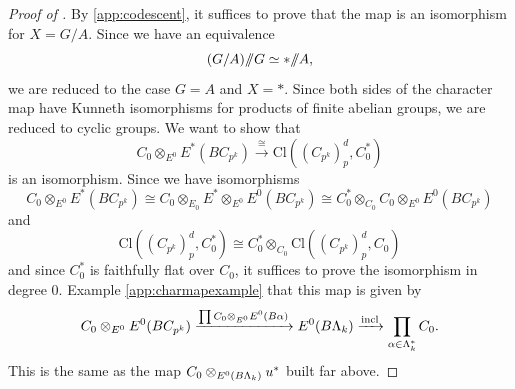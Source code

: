 \begin{proof}[{Proof of }]
By \ref{app:codescent}, it suffices to prove that the map is an isomorphism for \(X = G/A\).
Since we have an equivalence
\[
(G/A) /\!\!/ G \simeq * /\!\!/ A,
\]
we are reduced to the case \(G = A\) and \(X = *\).
Since both sides of the character map have Kunneth isomorphisms for products of finite abelian groups, we are reduced to cyclic groups.
We want to show that 
\[
C_0 \otimes_{E^0} E^*(BC_{p^k}) \xrightarrow{\cong} \mathrm{Cl}((C_{p^k})_{p}^{d}, C_{0}^{*})
\]
is an isomorphism.
Since we have isomorphisms
\[
C_0 \otimes_{E^0} E^*(BC_{p^k}) \cong C_{0} \otimes_{E_0} E^* \otimes_{E^0} E^0(BC_{p^k}) \cong C_{0}^* \otimes_{C_0} C_0 \otimes_{E^0} E^0(BC_{p^k})
\]
and
\[
\mathrm{Cl}((C_{p^k})_{p}^{d}, C_{0}^{*}) \cong C_{0}^* \otimes_{C_0} \mathrm{Cl}((C_{p^k})_{p}^{d}, C_{0})
\]
and since \(C_{0}^*\) is faithfully flat over \(C_0\), it suffices to prove the isomorphism in degree \(0\).
Example \ref{app:charmapexample} that this map is given by 
\[
C_0 \otimes_{E^0} E^0(BC_{p^k}) \xrightarrow{\prod C_{0} \otimes_{E^0} E^0(B\alpha)} E^0(B\Lambda_k) \xrightarrow{\mathrm{incl}} \prod_{\alpha \in \Lambda_k^*}C_0.
\]
This is the same as the map \(C_0 \otimes_{E^0(B\Lambda_k)} u^*\) built far above.%
%
%
%
\end{proof}




